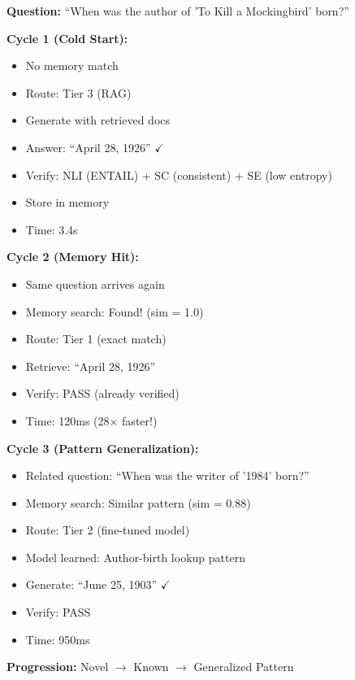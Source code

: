 \documentclass[12pt,a4paper]{article}
\theoremstyle{definition}
\begin{document}
\begin{examplebox}[title=Representative Success: Multi-Hop Question]

\textbf{Question:} ``When was the author of 'To Kill a Mockingbird' born?''

\textbf{Cycle 1 (Cold Start):}
\begin{itemize}
    \item No memory match
    \item Route: Tier 3 (RAG)
    \item Generate with retrieved docs
    \item Answer: ``April 28, 1926'' $\checkmark$
    \item Verify: NLI (ENTAIL) + SC (consistent) + SE (low entropy)
    \item Store in memory
    \item Time: 3.4s
\end{itemize}

\textbf{Cycle 2 (Memory Hit):}
\begin{itemize}
    \item Same question arrives again
    \item Memory search: Found! (sim = 1.0)
    \item Route: Tier 1 (exact match)
    \item Retrieve: ``April 28, 1926''
    \item Verify: PASS (already verified)
    \item Time: 120ms (28$\times$ faster!)
\end{itemize}

\textbf{Cycle 3 (Pattern Generalization):}
\begin{itemize}
    \item Related question: ``When was the writer of '1984' born?''
    \item Memory search: Similar pattern (sim = 0.88)
    \item Route: Tier 2 (fine-tuned model)
    \item Model learned: Author-birth lookup pattern
    \item Generate: ``June 25, 1903'' $\checkmark$
    \item Verify: PASS
    \item Time: 950ms
\end{itemize}

\textbf{Progression:} Novel $\rightarrow$ Known $\rightarrow$ Generalized Pattern
\end{examplebox}
\end{document}
